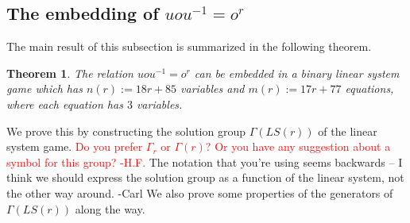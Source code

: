 \documentclass[11pt,letterpaper]{article}
\newcommand{\1}{\mathbb{1}}
\newcommand{\LS}{LS}
\def\carl#1{{\color{blue} #1 -Carl}}
\newcommand{\hfc}[1]{\textcolor{red}{#1 -H.F.}}
\newtheorem{theorem}{Theorem}[section]
\theoremstyle{definition}
\begin{document}
\subsection{The embedding of $uou^{-1} = o^r$}
The main result of this subsection is summarized in the following theorem.
\begin{theorem}
	The relation $uou^{-1} = o^r$ can be embedded in a binary linear system game which has
	$n(r) := 18r+85$ variables and $m(r) := 17r + 77$ equations, where each equation has $3$ variables.
\end{theorem}
We prove this by constructing the solution group $\Gamma(\LS(r))$ of the linear system game.
\hfc{Do you prefer $\Gamma_r$ or $\Gamma(r)$? Or you have any suggestion about a symbol for this group?} \carl{The notation that you're using seems backwards -- I think we should express the solution group as a function of the linear system, not the other way around.}
We also prove some properties of the generators of $\Gamma(\LS(r))$ along the way.
\end{document}
